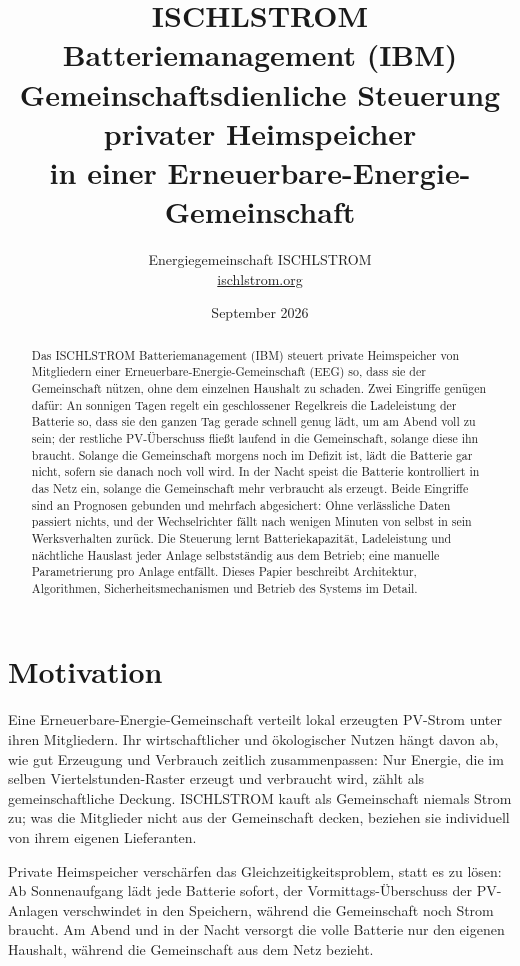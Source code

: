 \documentclass[11pt,a4paper]{article}
\title{\textbf{ISCHLSTROM Batteriemanagement (IBM)}\\[0.5em]
\large Gemeinschaftsdienliche Steuerung privater Heimspeicher\\
in einer Erneuerbare-Energie-Gemeinschaft}
\author{Energiegemeinschaft ISCHLSTROM \\ \href{https://ischlstrom.org}{ischlstrom.org}}
\date{September 2026}
\begin{document}
\maketitle

\begin{abstract}
\noindent
Das ISCHLSTROM Batteriemanagement (IBM) steuert private Heimspeicher von
Mitgliedern einer Erneuerbare-Energie-Gemeinschaft (EEG) so, dass sie der
Gemeinschaft nützen, ohne dem einzelnen Haushalt zu schaden. Zwei Eingriffe
genügen dafür: An sonnigen Tagen regelt ein geschlossener Regelkreis die
Ladeleistung der Batterie so, dass sie den ganzen Tag gerade schnell genug
lädt, um am Abend voll zu sein; der restliche PV-Überschuss fließt laufend
in die Gemeinschaft, solange diese ihn braucht. Solange die Gemeinschaft
morgens noch im Defizit ist, lädt die Batterie gar nicht, sofern sie danach
noch voll wird. In der Nacht speist die
Batterie kontrolliert in das Netz ein, solange die Gemeinschaft mehr
verbraucht als erzeugt. Beide
Eingriffe sind an Prognosen gebunden und mehrfach abgesichert: Ohne
verlässliche Daten passiert nichts, und der Wechselrichter fällt nach
wenigen Minuten von selbst in sein Werksverhalten zurück. Die Steuerung
lernt Batteriekapazität, Ladeleistung und nächtliche Hauslast jeder Anlage
selbstständig aus dem Betrieb; eine manuelle Parametrierung pro Anlage
entfällt. Dieses Papier beschreibt Architektur, Algorithmen,
Sicherheitsmechanismen und Betrieb des Systems im Detail.
\end{abstract}

\tableofcontents
\newpage

\section{Motivation}

Eine Erneuerbare-Energie-Gemeinschaft verteilt lokal erzeugten PV-Strom
unter ihren Mitgliedern. Ihr wirtschaftlicher und ökologischer Nutzen hängt
davon ab, wie gut Erzeugung und Verbrauch zeitlich zusammenpassen: Nur
Energie, die im selben Viertelstunden-Raster erzeugt und verbraucht wird,
zählt als gemeinschaftliche Deckung. ISCHLSTROM kauft als Gemeinschaft
niemals Strom zu; was die Mitglieder nicht aus der Gemeinschaft decken,
beziehen sie individuell von ihrem eigenen Lieferanten.

Private Heimspeicher verschärfen das Gleichzeitigkeitsproblem, statt es zu
lösen: Ab Sonnenaufgang lädt jede Batterie sofort, der Vormittags-Überschuss
der PV-Anlagen verschwindet in den Speichern, während die Gemeinschaft noch
Strom braucht. Am Abend und in der Nacht versorgt die volle Batterie nur den
eigenen Haushalt, während die Gemeinschaft aus dem Netz bezieht.
\end{document}
